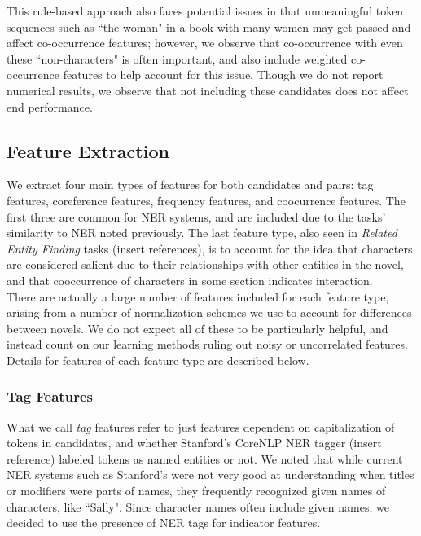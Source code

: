 \documentclass[12pt]{article}
\begin{document}
        This rule-based approach also faces potential issues in that unmeaningful token sequences such as
        ``the woman" in a book with many women may get passed and affect co-occurrence features; however,
        we observe that co-occurrence with even these ``non-characters" is often important, and also
        include weighted co-occurrence features to help account for this issue. Though we do not
        report numerical results, we observe that not including these candidates does not affect 
        end performance.

    \subsection{Feature Extraction}

        We extract four main types of features for both candidates and pairs: tag features,
        coreference features, frequency features, and coocurrence features. The first three are common
        for NER systems, and are included due to the tasks' similarity to NER noted previously. The last
        feature type, also seen in \emph{Related Entity Finding} tasks (insert references), is to account
        for the idea that characters are considered salient due to their relationships with other
        entities in the novel, and that cooccurrence of characters in some section indicates interaction. \\

        There are actually a large number of features included for each feature type, arising from a number
        of normalization schemes we use to account for differences between novels. We do not expect
        all of these to be particularly helpful, and instead count on our learning methods ruling out
        noisy or uncorrelated features. Details for features of each feature type are described below.

        \subsubsection{Tag Features}
        
        What we call \emph{tag} features refer to just features dependent on capitalization of tokens in
        candidates, and whether Stanford's CoreNLP NER tagger (insert reference) labeled tokens as 
        named entities or not. We noted that while current NER systems such as Stanford's were
        not very good at understanding when titles or modifiers were parts of names, they frequently
        recognized given names of characters, like ``Sally". Since character names often 
        include given names, we decided to use the presence of NER tags for indicator features. \\
\end{document}
